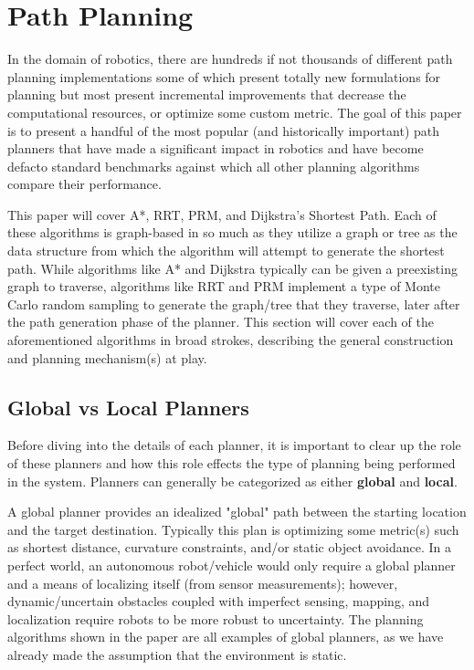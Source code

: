 \section{Path Planning}

In the domain of robotics, there are hundreds if not thousands of different path planning implementations some of which present totally new formulations for planning but most present incremental improvements that decrease the computational resources, or optimize some custom metric. The goal of this paper is to present a handful of the most popular (and historically important) path planners that have made a significant impact in robotics and have become defacto standard benchmarks against which all other planning algorithms compare their performance. 

This paper will cover A*, RRT, PRM, and Dijkstra's Shortest Path. Each of these algorithms is graph-based in so much as they utilize a graph or tree as the data structure from which the algorithm will attempt to generate the shortest path. While algorithms like A* and Dijkstra typically can be given a preexisting graph to traverse, algorithms like RRT and PRM implement a type of Monte Carlo random sampling to generate the graph/tree that they traverse, later after the path generation phase of the planner. This section will cover each of the aforementioned algorithms in broad strokes, describing the general construction and planning mechanism(s) at play.

\subsection{Global vs Local Planners}

Before diving into the details of each planner, it is important to clear up the role of these planners and how this role effects the type of planning being performed in the system. Planners can generally be categorized as either \textbf{global} and \textbf{local}.  

A global planner provides an idealized "global" path between the starting location and the target destination. Typically this plan is optimizing some metric(s) such as shortest distance, curvature constraints, and/or static object avoidance. In a perfect world, an autonomous robot/vehicle would only require a global planner and a means of localizing itself (from sensor measurements); however, dynamic/uncertain obstacles coupled with imperfect sensing, mapping, and localization require robots to be more robust to uncertainty. The planning algorithms shown in the paper are all examples of global planners, as we have already made the assumption that the environment is static. 

